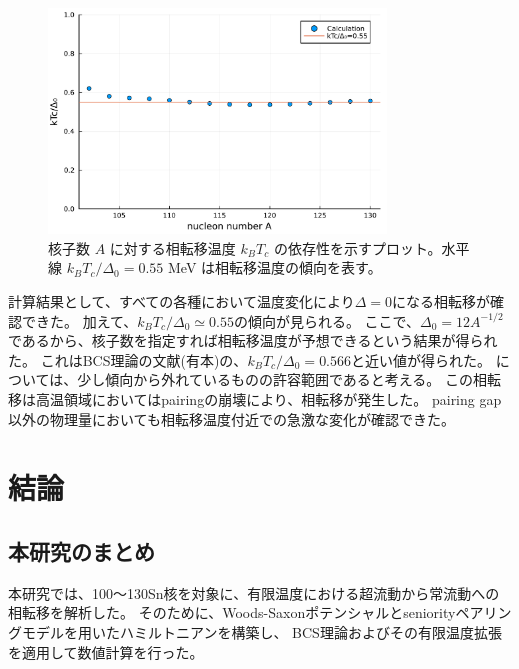 \documentclass[a4paper,11pt]{jsreport}
\begin{document}
  \begin{figure}[H]
    \centering
    \includegraphics[width=0.8\textwidth]{main_fig/kTc_vs_A.pdf}
    \caption{核子数 $A$ に対する相転移温度 $k_B T_c$ の依存性を示すプロット。水平線 $k_B T_c/\Delta_0 = 0.55$ MeV は相転移温度の傾向を表す。}
  \end{figure}
  
  計算結果として、すべての各種において温度変化により\(\Delta=0\)になる相転移が確認できた。
  加えて、$k_B T_c/\Delta_0\simeq0.55$の傾向が見られる。
  ここで、$\Delta_0=12A^{-1/2}$であるから、核子数を指定すれば相転移温度が予想できるという結果が得られた。
  これはBCS理論の文献(有本\cite{arimoto})の、\(k_BT_c/\Delta_0=0.566\)と近い値が得られた。
  については、少し傾向から外れているものの許容範囲であると考える。
  この相転移は高温領域においてはpairingの崩壊により、相転移が発生した。
  pairing gap以外の物理量においても相転移温度付近での急激な変化が確認できた。

\chapter{結論}
  \section{本研究のまとめ}
  本研究では、100〜130Sn核を対象に、有限温度における超流動から常流動への相転移を解析した。  
  そのために、Woods-Saxonポテンシャルとseniorityペアリングモデルを用いたハミルトニアンを構築し、  
  BCS理論およびその有限温度拡張を適用して数値計算を行った。
\end{document}
